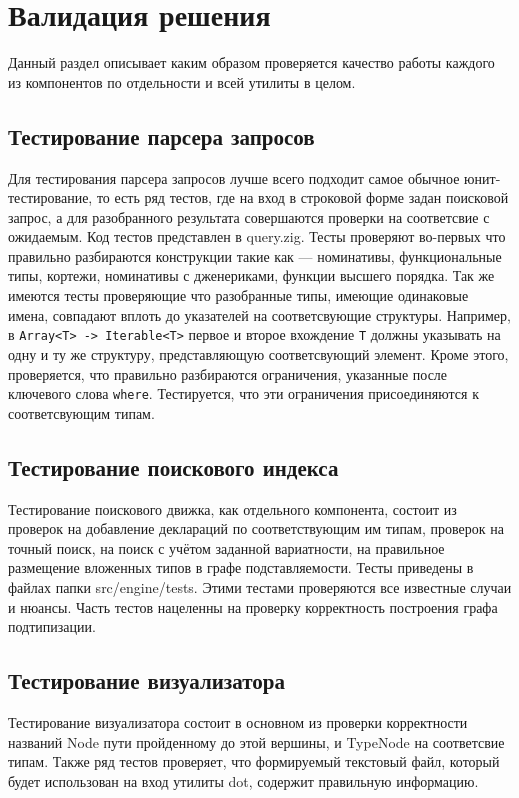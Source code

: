 \documentclass[times]{itmo-student-thesis}
\begin{document}
	\section{Валидация решения}
	Данный раздел описывает каким образом проверяется качество работы каждого из компонентов по отдельности и всей утилиты в целом. 
	
	\subsection{Тестирование парсера запросов}
	Для тестирования парсера запросов лучше всего подходит самое обычное юнит-тестирование, то есть ряд тестов, где на вход в строковой форме задан поисковой запрос, а для разобранного результата совершаются проверки на соответсвие с ожидаемым. Код тестов представлен в query.zig. Тесты проверяют во-первых что правильно разбираются конструкции такие как --- номинативы, функциональные типы, кортежи, номинативы с дженериками, функции высшего порядка. Так же имеются тесты проверяющие что разобранные типы, имеющие одинаковые имена, совпадают вплоть до указателей на соответсвующие структуры. Например, в \lstinline{Array<T> -> Iterable<T>} первое и второе вхождение \lstinline{T} должны указывать на одну и ту же структуру, представляющую соответсвующий элемент. Кроме этого, проверяется, что правильно разбираются ограничения, указанные после ключевого слова \lstinline{where}. Тестируется, что эти ограничения присоединяются к соответсвующим типам.
	
	\subsection{Тестирование поискового индекса}
	Тестирование поискового движка, как отдельного компонента, состоит из проверок на добавление деклараций по соответствующим им типам, проверок на точный поиск, на поиск с учётом заданной вариатности, на правильное размещение вложенных типов в графе подставляемости. Тесты приведены в файлах папки src/engine/tests. Этими тестами проверяются все известные случаи и нюансы. Часть тестов нацеленны на проверку корректность построения графа подтипизации.
	
	\subsection{Тестирование визуализатора}
	Тестирование визуализатора состоит в основном из проверки корректности названий Node пути пройденному до этой вершины, и TypeNode на соответсвие типам. Также ряд тестов проверяет, что формируемый текстовый файл, который будет использован на вход утилиты dot, содержит правильную информацию.
	
\end{document}
